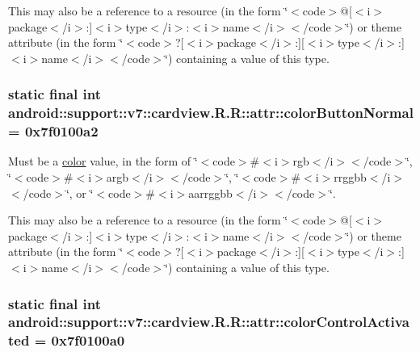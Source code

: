 This may also be a reference to a resource (in the form \char`\"{}$<$code$>$@\mbox{[}$<$i$>$package$<$/i$>$:\mbox{]}$<$i$>$type$<$/i$>$:$<$i$>$name$<$/i$>$$<$/code$>$\char`\"{}) or theme attribute (in the form \char`\"{}$<$code$>$?\mbox{[}$<$i$>$package$<$/i$>$:\mbox{]}\mbox{[}$<$i$>$type$<$/i$>$:\mbox{]}$<$i$>$name$<$/i$>$$<$/code$>$\char`\"{}) containing a value of this type. \hypertarget{classandroid_1_1support_1_1v7_1_1cardview_1_1_r_1_1attr_2c96f008bcdb10343244b9e8ab342e60}{
\subsubsection[{colorButtonNormal}]{\setlength{\rightskip}{0pt plus 5cm}static final int android::support::v7::cardview.R.R::attr::colorButtonNormal = 0x7f0100a2}}
\label{classandroid_1_1support_1_1v7_1_1cardview_1_1_r_1_1attr_2c96f008bcdb10343244b9e8ab342e60}


Must be a \hyperlink{classandroid_1_1support_1_1v7_1_1cardview_1_1_r_1_1color}{color} value, in the form of \char`\"{}$<$code$>$\#$<$i$>$rgb$<$/i$>$$<$/code$>$\char`\"{}, \char`\"{}$<$code$>$\#$<$i$>$argb$<$/i$>$$<$/code$>$\char`\"{}, \char`\"{}$<$code$>$\#$<$i$>$rrggbb$<$/i$>$$<$/code$>$\char`\"{}, or \char`\"{}$<$code$>$\#$<$i$>$aarrggbb$<$/i$>$$<$/code$>$\char`\"{}. 

This may also be a reference to a resource (in the form \char`\"{}$<$code$>$@\mbox{[}$<$i$>$package$<$/i$>$:\mbox{]}$<$i$>$type$<$/i$>$:$<$i$>$name$<$/i$>$$<$/code$>$\char`\"{}) or theme attribute (in the form \char`\"{}$<$code$>$?\mbox{[}$<$i$>$package$<$/i$>$:\mbox{]}\mbox{[}$<$i$>$type$<$/i$>$:\mbox{]}$<$i$>$name$<$/i$>$$<$/code$>$\char`\"{}) containing a value of this type. \hypertarget{classandroid_1_1support_1_1v7_1_1cardview_1_1_r_1_1attr_c00947e055ae13ea921ba0212d620dce}{
\subsubsection[{colorControlActivated}]{\setlength{\rightskip}{0pt plus 5cm}static final int android::support::v7::cardview.R.R::attr::colorControlActivated = 0x7f0100a0}}
\label{classandroid_1_1support_1_1v7_1_1cardview_1_1_r_1_1attr_c00947e055ae13ea921ba0212d620dce}


